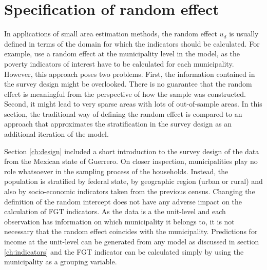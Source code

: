 \section{Specification of random effect}
\label{ch:raneff}
In applications of small area estimation methods, the random effect $u_d$ is usually defined in terms of the domain for which the indicators should be calculated.
For example, \cite{rojas_perilla_data_2020} use a random effect at the municipality level in the model, as the poverty indicators of interest have to be calculated for each municipality.
However, this approach poses two problems.
First, the information contained in the survey design might be overlooked.
There is no guarantee that the random effect is meaningful from the perspective of how the sample was constructed.
Second, it might lead to very sparse areas with lots of out-of-sample areas.
In this section, the traditional way of defining the random effect is compared to an approach that approximates the stratification in the survey design as an additional iteration of the model.

Section \ref{ch:design} included a short introduction to the survey design of the data from the Mexican state of Guerrero.
On closer inspection, municipalities play no role whatsoever in the sampling process of the households.
Instead, the population is stratified by federal state, by geographic region (urban or rural) and also by socio-economic indicators taken from the previous census.
Changing the definition of the random intercept does not have any adverse impact on the calculation of FGT indicators.
As the data is a the unit-level and each observation has information on which municipality it belongs to, it is not necessary that the random effect coincides with the municipality.
Predictions for income at the unit-level can be generated from any model as discussed in section \ref{ch:indicators} and the FGT indicator can be calculated simply by using the municipality as a grouping variable.

